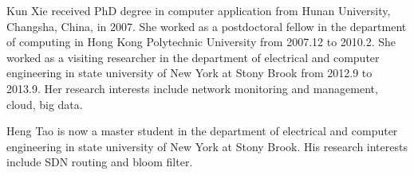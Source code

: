 \documentclass[10pt,journal,compsoc]{IEEEtran}
\begin{document}
\begin{IEEEbiography}{Kun Xie}
received PhD degree in computer application from Hunan University, Changsha, China,
in 2007. She worked as a postdoctoral fellow
in the department of computing in Hong Kong Polytechnic University from
2007.12 to 2010.2. She worked as a visiting researcher in the department
of electrical and computer engineering in state university of New York at
Stony Brook from 2012.9 to 2013.9.
Her research interests include network monitoring and management, cloud, big data.
\end{IEEEbiography}
\begin{IEEEbiography}{Heng Tao}
 is now a master student in the department of electrical and computer engineering in state university of New York at
Stony Brook. His research interests include SDN routing and bloom filter.
\end{IEEEbiography}
\end{document}
